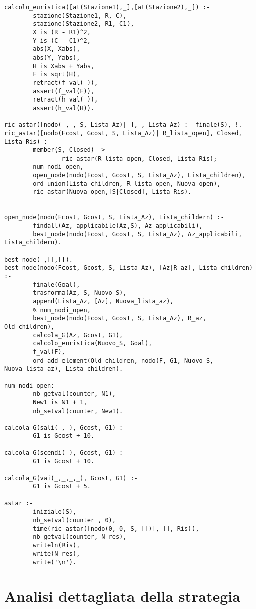 \begin{lstlisting}
calcolo_euristica([at(Stazione1),_],[at(Stazione2),_]) :-
        stazione(Stazione1, R, C),
        stazione(Stazione2, R1, C1),
        X is (R - R1)^2,
        Y is (C - C1)^2,
        abs(X, Xabs),
        abs(Y, Yabs),
        H is Xabs + Yabs,
        F is sqrt(H),
        retract(f_val(_)),
        assert(f_val(F)),
        retract(h_val(_)),
        assert(h_val(H)).

ric_astar([nodo(_,_, S, Lista_Az)|_],_, Lista_Az) :- finale(S), !.
ric_astar([nodo(Fcost, Gcost, S, Lista_Az)| R_lista_open], Closed, Lista_Ris) :-
        member(S, Closed) ->
                ric_astar(R_lista_open, Closed, Lista_Ris);
        num_nodi_open,
        open_node(nodo(Fcost, Gcost, S, Lista_Az), Lista_children),
        ord_union(Lista_children, R_lista_open, Nuova_open),
        ric_astar(Nuova_open,[S|Closed], Lista_Ris).


open_node(nodo(Fcost, Gcost, S, Lista_Az), Lista_childern) :-
        findall(Az, applicabile(Az,S), Az_applicabili),
        best_node(nodo(Fcost, Gcost, S, Lista_Az), Az_applicabili, Lista_childern).

best_node(_,[],[]).
best_node(nodo(Fcost, Gcost, S, Lista_Az), [Az|R_az], Lista_children) :-
        finale(Goal),
        trasforma(Az, S, Nuovo_S),
        append(Lista_Az, [Az], Nuova_lista_az),
        % num_nodi_open,
        best_node(nodo(Fcost, Gcost, S, Lista_Az), R_az, Old_children),
        calcola_G(Az, Gcost, G1),
        calcolo_euristica(Nuovo_S, Goal),
        f_val(F),
        ord_add_element(Old_children, nodo(F, G1, Nuovo_S, Nuova_lista_az), Lista_children).

num_nodi_open:-
        nb_getval(counter, N1),
        New1 is N1 + 1,
        nb_setval(counter, New1).

calcola_G(sali(_,_), Gcost, G1) :-
        G1 is Gcost + 10.

calcola_G(scendi(_), Gcost, G1) :-
        G1 is Gcost + 10.

calcola_G(vai(_,_,_,_), Gcost, G1) :-
        G1 is Gcost + 5.

astar :-
        iniziale(S),
        nb_setval(counter , 0),
        time(ric_astar([nodo(0, 0, S, [])], [], Ris)),
        nb_getval(counter, N_res),
        writeln(Ris),
        write(N_res),
        write('\n').
\end{lstlisting}

\section{Analisi dettagliata della strategia}


